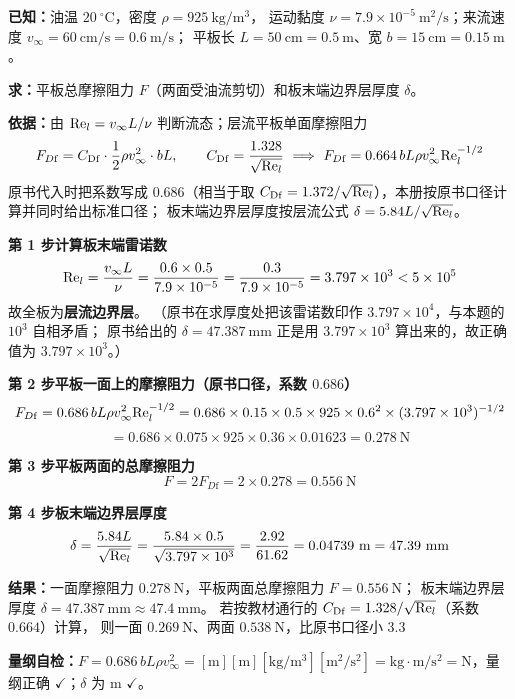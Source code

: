 \begin{jie}
\textbf{已知：}油温 $20\ ^{\circ}\mathrm{C}$，密度 $\rho=925\ \mathrm{kg/m^3}$，
运动黏度 $\nu=7.9\times10^{-5}\ \mathrm{m^2/s}$；来流速度 $v_\infty=60\ \mathrm{cm/s}=0.6\ \mathrm{m/s}$；
平板长 $L=50\ \mathrm{cm}=0.5\ \mathrm{m}$、宽 $b=15\ \mathrm{cm}=0.15\ \mathrm{m}$。

\textbf{求：}平板总摩擦阻力 $F$（两面受油流剪切）和板末端边界层厚度 $\delta$。

\textbf{依据：}由 $\mathrm{Re}_l=v_\infty L/\nu$ 判断流态；层流平板单面摩擦阻力
\[ F_{D\mathrm{f}}=C_{\mathrm{Df}}\cdot\frac{1}{2}\rho v_\infty^{2}\cdot bL,\qquad
C_{\mathrm{Df}}=\frac{1.328}{\sqrt{\Rey_l}}\ \Longrightarrow\ F_{D\mathrm{f}}=0.664\,bL\rho v_\infty^{2}\Rey_l^{-1/2} \]
原书代入时把系数写成 $0.686$（相当于取 $C_{\mathrm{Df}}=1.372/\sqrt{\mathrm{Re}_l}$），本册按原书口径计算并同时给出标准口径；
板末端边界层厚度按层流公式 $\delta=5.84L/\sqrt{\mathrm{Re}_l}$。

\textbf{第 1 步\quad 计算板末端雷诺数}
\[ \mathrm{Re}_l=\frac{v_\infty L}{\nu}=\frac{0.6\times0.5}{7.9\times10^{-5}}=\frac{0.3}{7.9\times10^{-5}}=3.797\times10^{3}<5\times10^{5} \]
故全板为\textbf{层流边界层}。
（原书在求厚度处把该雷诺数印作 $3.797\times10^{4}$，与本题的 $10^{3}$ 自相矛盾；
原书给出的 $\delta=47.387\ \mathrm{mm}$ 正是用 $3.797\times10^{3}$ 算出来的，故正确值为 $3.797\times10^{3}$。）

\textbf{第 2 步\quad 平板一面上的摩擦阻力（原书口径，系数 $0.686$）}
\[ F_{D\mathrm{f}}=0.686\,bL\rho v_\infty^{2}\mathrm{Re}_l^{-1/2}
=0.686\times0.15\times0.5\times925\times0.6^{2}\times(3.797\times10^{3})^{-1/2} \]
\[ =0.686\times0.075\times925\times0.36\times0.01623=0.278\ \mathrm{N} \]

\textbf{第 3 步\quad 平板两面的总摩擦阻力}
\[ F=2F_{D\mathrm{f}}=2\times0.278=0.556\ \mathrm{N} \]

\textbf{第 4 步\quad 板末端边界层厚度}
\[ \delta=\frac{5.84L}{\sqrt{\mathrm{Re}_l}}=\frac{5.84\times0.5}{\sqrt{3.797\times10^{3}}}
=\frac{2.92}{61.62}=0.04739\ \mathrm{m}=47.39\ \mathrm{mm} \]

\textbf{结果：}一面摩擦阻力 $0.278\ \mathrm{N}$，平板两面总摩擦阻力 $F=0.556\ \mathrm{N}$；
板末端边界层厚度 $\delta=47.387\ \mathrm{mm}\approx47.4\ \mathrm{mm}$。
若按教材通行的 $C_{\mathrm{Df}}=1.328/\sqrt{\mathrm{Re}_l}$（系数 $0.664$）计算，
则一面 $0.269\ \mathrm{N}$、两面 $0.538\ \mathrm{N}$，比原书口径小 3.3%

\textbf{量纲自检：}$F=0.686\,bL\rho v_\infty^{2}=[\mathrm{m}][\mathrm{m}][\mathrm{kg/m^3}][\mathrm{m^2/s^2}]
=\mathrm{kg\cdot m/s^2}=\mathrm{N}$，量纲正确 $\checkmark$；$\delta$ 为 $\mathrm{m}$ $\checkmark$。
\end{jie}

